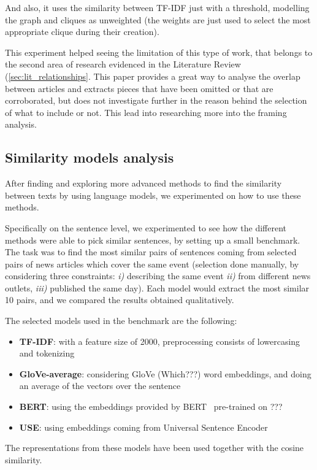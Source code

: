 And also, it uses the similarity between TF-IDF just with a threshold, modelling the graph and cliques as unweighted (the weights are just used to select the most appropriate clique during their creation).

This experiment helped seeing the limitation of this type of work, that belongs to the second area of research evidenced in the Literature Review (\ref{sec:lit_relationships}. This paper provides a great way to analyse the overlap between articles and extracts pieces that have been omitted or that are corroborated, but does not investigate further in the reason behind the selection of what to include or not. This lead into researching more into the framing analysis. 



\subsection{Similarity models analysis}
After finding and exploring more advanced methods to find the similarity between texts by using language models, we experimented on how to use these methods.

Specifically on the sentence level, we experimented to see how the different methods were able to pick similar sentences, by setting up a small benchmark. The task was to find the most similar pairs of sentences coming from selected pairs of news articles which cover the same event (selection done manually, by considering three constraints: \textit{i)} describing the same event \textit{ii)} from different news outlets, \textit{iii)} published the same day).
Each model would extract the most similar 10 pairs, and we compared the results obtained qualitatively.

The selected models used in the benchmark are the following:
\begin{itemize}
    \item \textbf{TF-IDF}: with a feature size of 2000, preprocessing consists of lowercasing and tokenizing
    \item \textbf{GloVe-average}: considering GloVe (Which???) word embeddings, and doing an average of the vectors over the sentence
    \item \textbf{BERT}: using the embeddings provided by BERT~\cite{devlin2018bert} pre-trained on ???
    \item \textbf{USE}: using embeddings coming from Universal Sentence Encoder~\cite{cer2018universal}
\end{itemize}
The representations from these models have been used together with the cosine similarity.

